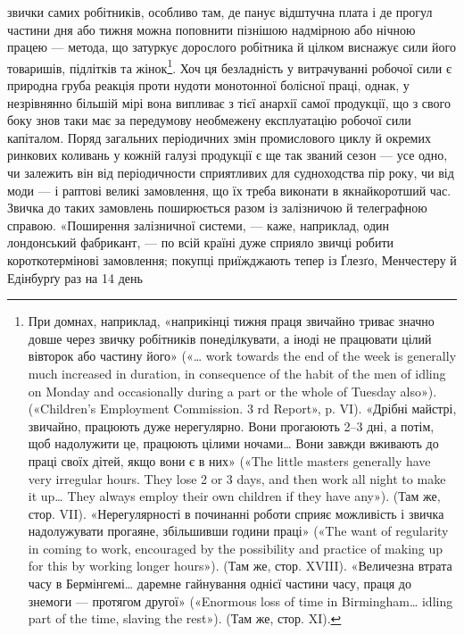 \parcont{}  %
звички самих робітників, особливо там, де панує відштучна плата
і де прогул частини дня або тижня можна поповнити пізнішою
надмірною або нічною працею — метода, що затуркує дорослого
робітника й цілком виснажує сили його товаришів, підлітків та
жінок\footnote{
При домнах, наприклад, «наприкінці тижня праця звичайно
триває значно довше через звичку робітників понеділкувати, а іноді не
працювати цілий вівторок або частину його» («\dots{} work towards the
end of the week is generally much increased in duration, in consequence
of the habit of the men of idling on Monday and occasionally during a part
or the whole of Tuesday also»). («Children’s Employment Commission.
3 rd Report», p. VI). «Дрібні майстрі, звичайно, працюють дуже нерегулярно.
Вони прогаюють 2--3 дні, а потім, щоб надолужити це, працюють
цілими ночами\dots{} Вони завжди вживають до праці своїх дітей, якщо вони
є в них» («The little masters generally have very irregular hours. They
lose 2 or 3 days, and then work all night to make it up\dots{} They always employ
their own children if they have any»). (Там же, стор. VII). «Нерегулярності
в починанні роботи сприяє можливість і звичка надолужувати прогаяне,
збільшивши години праці» («The want of regularity in coming to work,
encouraged by the possibility and practice of making up for this by working
longer hours»). (Там же, стор. XVIII). «Величезна втрата часу в Бермінгемі\dots{} даремне гайнування
однієї частини часу, праця до знемоги — протягом другої» («Enormous loss of time in Birmingham\dots{}
idling part of
the time, slaving the rest»). (Там же, стор. XI).
}. Хоч ця безладність у витрачуванні робочої сили є
природна груба реакція проти нудоти монотонної болісної
праці, однак, у незрівнянно більшій мірі вона випливає з тієї
анархії самої продукції, що з свого боку знов таки має за передумову необмежену експлуатацію робочої
сили капіталом. Поряд
загальних періодичних змін промислового циклу й окремих ринкових коливань у кожній галузі продукції
є ще так званий сезон — усе одно, чи залежить він від періодичности сприятливих
для судноходства пір року, чи від моди — і раптові великі замовлення, що їх треба виконати в
якнайкоротший час. Звичка до
таких замовлень поширюється разом із залізничою й телеграфною справою. «Поширення залізничної
системи, — каже, наприклад, один лондонський фабрикант, — по всій країні дуже сприяло
звичці робити короткотермінові замовлення; покупці приїжджають тепер із Ґлезґо, Менчестеру й
Едінбурґу раз на 14 день
